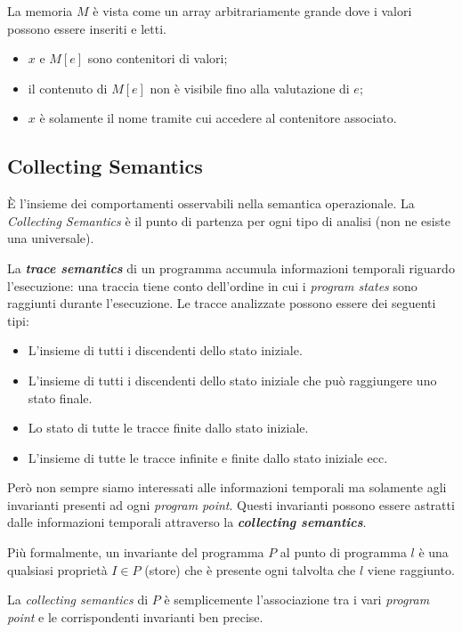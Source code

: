 \documentclass[a4paper, 10pt]{book}
\begin{document}
La memoria $M$ è vista come un array arbitrariamente grande dove i valori possono essere inseriti e letti.

\begin{itemize}
	\item $x$ e $M[e]$ sono contenitori di valori;
	\item il contenuto di $M[e]$ non è visibile fino alla valutazione di $e$;
	\item $x$ è solamente il nome tramite cui accedere al contenitore associato.
\end{itemize}



\subsection{Collecting Semantics}
\MakeUppercase{è} l'insieme dei comportamenti osservabili nella semantica operazionale. La \textit{Collecting Semantics} è il punto di partenza per ogni tipo di analisi (non ne esiste una universale).

La \textbf{\textit{trace semantics}} di un programma accumula informazioni temporali riguardo l'esecuzione: una traccia tiene conto dell'ordine in cui i \textit{program states} sono raggiunti durante l'esecuzione.
\noindent
Le tracce analizzate possono essere dei seguenti tipi:
\begin{itemize}
	\item L'insieme di tutti i discendenti dello stato iniziale.
	\item L'insieme di tutti i discendenti dello stato iniziale che può raggiungere uno stato finale.
	\item Lo stato di tutte le tracce finite dallo stato iniziale.
	\item L'insieme di tutte le tracce infinite e finite dallo stato iniziale ecc.
\end{itemize}

Però non sempre siamo interessati alle informazioni temporali ma solamente agli invarianti presenti ad ogni \textit{program point}. Questi invarianti possono essere astratti dalle informazioni temporali attraverso la \textbf{\textit{collecting semantics}}.

Più formalmente, un invariante del programma $P$ al punto di programma $l$ è una qualsiasi proprietà $I\in P$ (store) che è presente ogni talvolta che $l$ viene raggiunto.

La \textit{collecting semantics} di $P$ è semplicemente l'associazione tra i vari \textit{program point} e le corrispondenti invarianti ben precise.
\end{document}
